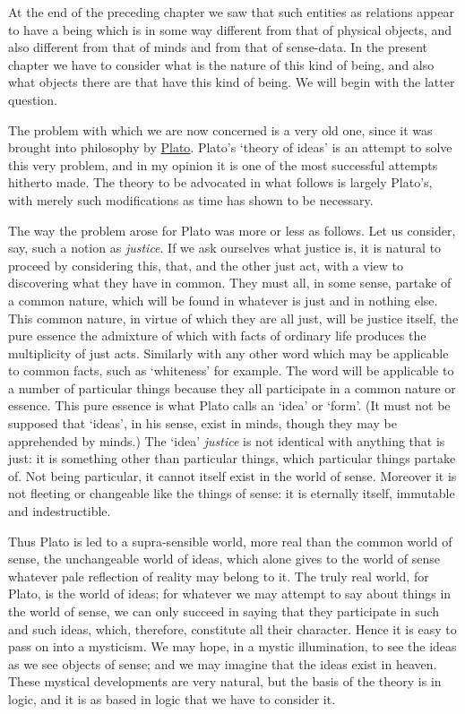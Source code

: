 \documentclass[oneside,letterpaper,12pt]{book}
\begin{document}
At the end of the preceding chapter we saw that such entities as
relations appear to have a being which is in some way different from
that of physical objects, and also different from that of minds and from
that of sense-data. In the present chapter we have to consider what is
the nature of this kind of being, and also what objects there are that
have this kind of being. We will begin with the latter question.

The problem with which we are now concerned is a very old one, since it
was brought into philosophy by \href{https://plato.stanford.edu/entries/plato/}{Plato}. 
Plato's `theory of ideas' is an attempt to
solve this very problem, and in my opinion it is one of the most
successful attempts hitherto made. The theory to be advocated in what
follows is largely Plato's, with merely such
modifications as time has shown to be necessary.

The way the problem arose for Plato was more or less as follows. Let us
consider, say, such a notion as \emph{justice}. \label{tokens} If we ask ourselves what
justice is, it is natural to proceed by considering this, that, and the
other just act, with a view to discovering what they have in common.
They must all, in some sense, partake of a common nature, which will be
found in whatever is just and in nothing else. This common nature, in
virtue of which they are all just, will be justice itself, the pure
essence the admixture of which with facts of ordinary life produces the
multiplicity of just acts. Similarly with any other word which may be
applicable to common facts, such as
`whiteness' for example. The word will
be applicable to a number of particular things because they all
participate in a common nature or essence. \label{types} This pure essence is what
Plato calls an `idea' or
`form'. (It must not be supposed that
`ideas', in his sense, exist in minds,
though they may be apprehended by minds.) The
`idea' \emph{justice} is not identical
with anything that is just: it is something other than particular
things, which particular things partake of. Not being particular, it
cannot itself exist in the world of sense. Moreover it is not fleeting
or changeable like the things of sense: it is eternally itself,
immutable and indestructible.

Thus Plato is led to a supra-sensible world, more real than the common
world of sense, the unchangeable world of ideas, which alone gives to
the world of sense whatever pale reflection of reality may belong to it.
The truly real world, for Plato, is the world of ideas; for whatever we
may attempt to say about things in the world of sense, we can only
succeed in saying that they participate in such and such ideas, which,
therefore, constitute all their character. Hence it is easy to pass on
into a mysticism. We may hope, in a mystic illumination, to see the
ideas as we see objects of sense; and we may imagine that the ideas
exist in heaven. These mystical developments are very natural, but the
basis of the theory is in logic, and it is as based in logic that we
have to consider it.
\end{document}
